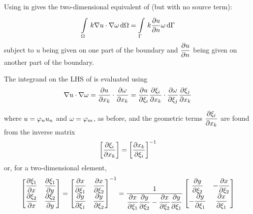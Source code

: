 Using  in  gives the 
two-dimensional equivalent of  
(but with no source term):
\begin{equation}
  \goneint{k \dotprod{\gradient{}{u}}{\gradient{}{\omega}}}{\Omega}
  = \goneint{k \delby{u}{n}\omega}{\Gamma}
  \label{eqn:2-D_equiv}
\end{equation}
subject to $u$ being given on one part of the boundary and $ \dfrac{\partial u}{\partial n} $
being given on another part of the boundary.

The integrand on the LHS of  is evaluated using
\begin{equation}
  \dotprod{\gradient{}{u}}{\gradient{}{\omega}} = \dotprod{\delby{u}{x_{k}}}{\delby{\omega}{x_{k}}} = 
  \dotprod{\delby{u}{\xi_{i}} \delby{\xi_{i}}{x_{k}}}{\delby{\omega}{\xi_{j}} 
  \delby{\xi_{j}}{x_{k}}}
  \label{eqn:integrand}
\end{equation}
        
where $u= \varphi_{n} u_{n}$ and $\omega= \varphi_{m} $, as before, and the geometric terms
$ \dfrac{\partial \xi_{i}}{\partial x_{k}} $ are found from the inverse matrix
\begin{equation*}
  \left[  \dfrac{\partial \xi_{i}}{\partial x_{k}}  \right]=\left[  \dfrac{\partial x_{k}}{\partial \xi_{i}}  \right]^{-1} 
\end{equation*} 
or, for a two-dimensional element,
\begin{equation*}
  \begin{bmatrix}
     \dfrac{\partial \xi_{1}}{\partial x}  &  \dfrac{\partial \xi_{1}}{\partial y}  \\
     \dfrac{\partial \xi_{2}}{\partial x}  &  \dfrac{\partial \xi_{2}}{\partial y} 
  \end{bmatrix} =
  \begin{bmatrix}
     \dfrac{\partial x}{\partial \xi_{1}}  &  \dfrac{\partial x}{\partial \xi_{2}}  \\
     \dfrac{\partial y}{\partial \xi_{1}}  &  \dfrac{\partial y}{\partial \xi_{2}} 
  \end{bmatrix}^{-1} =
  \dfrac{1}{ \dfrac{\partial x}{\partial \xi_1}  \dfrac{\partial y}{\partial \xi_2} -  \dfrac{\partial x}{\partial \xi_2}  \dfrac{\partial y}{\partial \xi_1} }
  \begin{bmatrix}
     \dfrac{\partial y}{\partial \xi_{2}}  & - \dfrac{\partial x}{\partial \xi_{2}} \\
    - \dfrac{\partial y}{\partial \xi_{1}}  &  \dfrac{\partial x}{\partial \xi_{1}} 
  \end{bmatrix}
\end{equation*}



